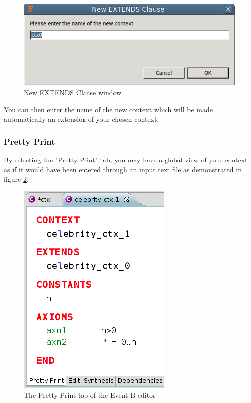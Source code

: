 \begin{figure}[!h]
\begin{center}
	\includegraphics{img/reference/ref_01_eventb_editor9.png}
	\caption{New EXTENDS Clause window}
	\label{fig_ref_01_eventb_editor9}
\end{center}
\end{figure}

You can then enter the name of the new context which will be made automatically an extension of your chosen context. 

\subsubsection{Pretty Print}

By selecting the "Pretty Print" tab, you may have a global view of your context as if it would have been entered through an input text file as demonstrated in figure \ref{fig_ref_01_eventb_editor10}.

\begin{figure}[!h]
\begin{center}
	\includegraphics{img/reference/ref_01_eventb_editor10.png}
	\caption{The Pretty Print tab of the Event-B editor}
	\label{fig_ref_01_eventb_editor10}
\end{center}
\end{figure}

